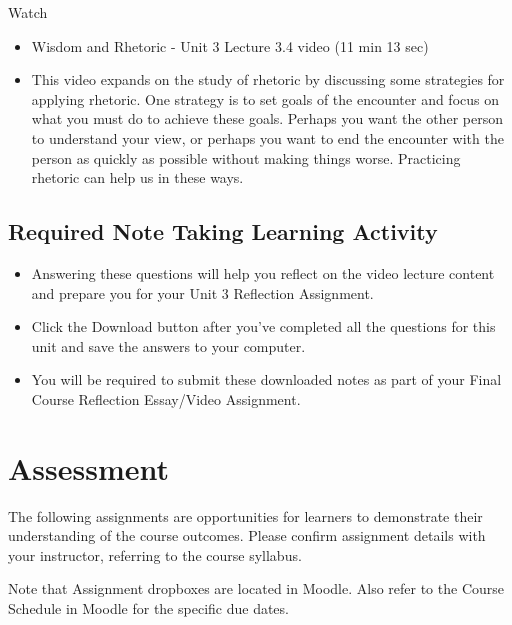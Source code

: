 \documentclass[
]{book}
\providecommand{\tightlist}{%
  \setlength{\itemsep}{0pt}\setlength{\parskip}{0pt}}
\begin{document}
Watch

\begin{itemize}
\tightlist
\item
  Wisdom and Rhetoric - Unit 3 Lecture 3.4 video (11 min 13 sec)
\item
  This video expands on the study of rhetoric by discussing some strategies for applying rhetoric. One strategy is to set goals of the encounter and focus on what you must do to achieve these goals. Perhaps you want the other person to understand your view, or perhaps you want to end the encounter with the person as quickly as possible without making things worse. Practicing rhetoric can help us in these ways.
\end{itemize}

\hypertarget{required-note-taking-learning-activity-2}{%
\section*{Required Note Taking Learning Activity}\label{required-note-taking-learning-activity-2}}

\begin{itemize}
\tightlist
\item
  Answering these questions will help you reflect on the video lecture content and prepare you for your Unit 3 Reflection Assignment.
\item
  Click the Download button after you've completed all the questions for this unit and save the answers to your computer.
\item
  You will be required to submit these downloaded notes as part of your Final Course Reflection Essay/Video Assignment.
\end{itemize}

\hypertarget{assessment}{%
\chapter*{Assessment}\label{assessment}}

The following assignments are opportunities for learners to demonstrate their understanding of the course outcomes. Please confirm assignment details with your instructor, referring to the course syllabus.

Note that Assignment dropboxes are located in Moodle. Also refer to the Course Schedule in Moodle for the specific due dates.
\end{document}
